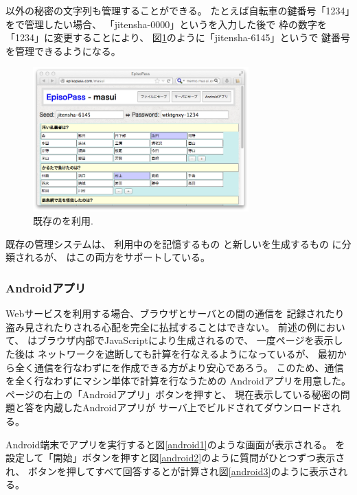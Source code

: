 \documentclass[twoside]{wiss}
\begin{document}
{\PW}以外の秘密の文字列も管理することができる。
たとえば自転車の鍵番号「\textsf{1234}」を{\EP}で管理したい場合、
「\textsf{jitensha-0000}」という{\SS}を入力した後で
{\PW}枠の数字を「\textsf{1234}」に変更することにより、
図\ref{web5}のように「\textsf{jitensha-6145}」という{\SS}で
鍵番号を管理できるようになる。

\begin{figure}[H]
\centerline{\includegraphics[width=83mm,bb=0 0 718 479]{figures/494cef6da1be0a069ee56e7ec8dcb9a7.png}}
\caption{既存の{\PW}を利用.}
\label{web5}
\end{figure}

既存の{\PW}管理システムは、
利用中の{\PW}を記憶するもの%
\cite{OnePassword}%
\cite{Dashlane}%
\cite{ミルパス}%
\cite{LastPass}%
\cite{KeyPass}%
\cite{NortonIDSafe}%
\cite{IDManager}%
と新しい{\PW}を生成するもの%
\cite{SuperGenPass}%
に分類されるが、
{\EP}はこの両方をサポートしている。

\subsubsection{Androidアプリ}

Webサービスを利用する場合、ブラウザとサーバとの間の通信を
記録されたり盗み見されたりされる心配を完全に払拭することはできない。
前述の例において、
{\PW}はブラウザ内部でJavaScriptにより生成されるので、
一度ページを表示した後は
ネットワークを遮断しても{\PW}計算を行なえるようになっているが、
最初から全く通信を行なわずに{\PW}を作成できる方がより安心であろう。
このため、通信を全く行なわずにマシン単体で{\PW}計算を行なうための
Androidアプリを用意した。
ページの右上の「Androidアプリ」ボタンを押すと、
現在表示している秘密の問題と答を内蔵したAndroidアプリが
サーバ上でビルドされてダウンロードされる。

Android端末でアプリを実行すると図\ref{android1}のような画面が表示される。
{\SS}を設定して「開始」ボタンを押すと図\ref{android2}のように質問がひとつずつ表示され、
ボタンを押してすべて回答すると{\PW}が計算され図\ref{android3}のように表示される。
\end{document}
